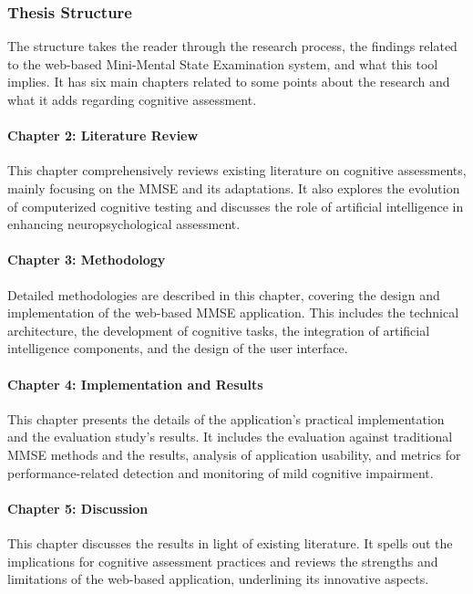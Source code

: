 \subsubsection{Thesis Structure}

The structure takes the reader through the research process, the findings related to the web-based Mini-Mental State Examination system, and what this tool implies. It has six main chapters related to some points about the research and what it adds regarding cognitive assessment.

\paragraph{Chapter 2: Literature Review} This chapter comprehensively reviews existing literature on cognitive assessments, mainly focusing on the MMSE and its adaptations. It also explores the evolution of computerized cognitive testing and discusses the role of artificial intelligence in enhancing neuropsychological assessment.

\paragraph{Chapter 3: Methodology} Detailed methodologies are described in this chapter, covering the design and implementation of the web-based MMSE application. This includes the technical architecture, the development of cognitive tasks, the integration of artificial intelligence components, and the design of the user interface.

\paragraph{Chapter 4: Implementation and Results} This chapter presents the details of the application's practical implementation and the evaluation study's results. It includes the evaluation against traditional MMSE methods and the results, analysis of application usability, and metrics for performance-related detection and monitoring of mild cognitive impairment.

\paragraph{Chapter 5: Discussion} This chapter discusses the results in light of existing literature. It spells out the implications for cognitive assessment practices and reviews the strengths and limitations of the web-based application, underlining its innovative aspects.

